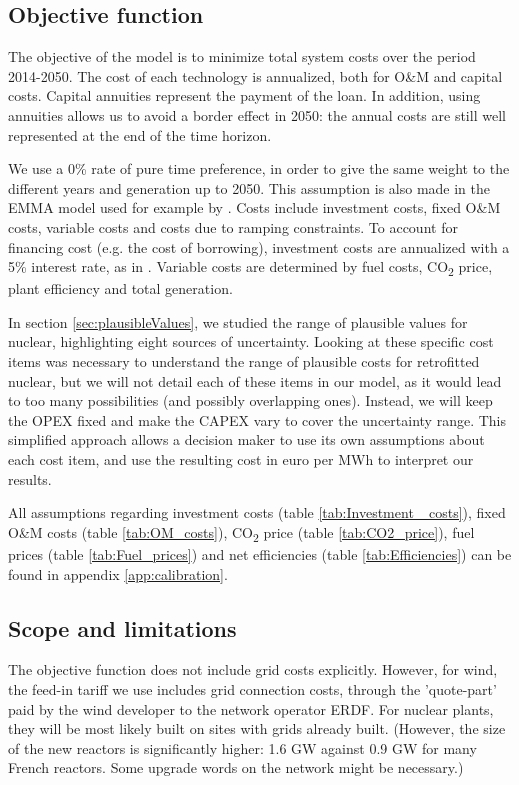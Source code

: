 \subsection{Objective function}

The objective of the model is to minimize total system costs over the period 2014-2050.
The cost of each technology is annualized, both for O\&M and capital costs. 
Capital annuities represent the payment of the loan. 
In addition, using annuities allows us to avoid a border effect in 2050: the annual costs are still well represented at the end of the time horizon.

We use a 0\% rate of pure time preference, in order to give the same weight to the different years and generation up to 2050. This assumption is also made in the EMMA model \citep{EMMA} used for example by \citet{Hirth2016}.
Costs include investment costs, fixed O\&M costs, variable costs and costs due to ramping constraints.
To account for financing cost (e.g. the cost of borrowing), investment costs are annualized with a 5\% interest rate, as in \citet{Jagemann2013}.
Variable costs are determined by fuel costs, CO\textsubscript{2} price, plant efficiency and total generation.

In section \ref{sec:plausibleValues}, we studied the range of plausible values for nuclear, highlighting eight sources of uncertainty. Looking at these specific cost items was necessary to understand the range of plausible costs for retrofitted nuclear, but we will not detail each of these items in our model, as it would lead to too many possibilities (and possibly overlapping ones). Instead, we will keep the OPEX fixed and make the CAPEX vary to cover the uncertainty range. This simplified approach allows a decision maker to use its own assumptions about each cost item, and use the resulting cost in euro per MWh to interpret our results.

All assumptions regarding investment costs (table \ref{tab:Investment _costs}), fixed O\&M costs (table \ref{tab:OM_costs}), CO\textsubscript{2} price (table \ref{tab:CO2_price}), fuel prices (table \ref{tab:Fuel_prices}) and net efficiencies (table \ref{tab:Efficiencies}) can be found in appendix \ref{app:calibration}.

\subsection{Scope and limitations}

The objective function does not include grid costs explicitly.
However, for wind, the feed-in tariff we use includes grid connection costs, through the 'quote-part' paid by the wind developer to the network operator ERDF.
For nuclear plants, they will be most likely built on sites with grids already built. (However, the size of the new reactors is significantly higher: 1.6 GW against 0.9 GW for many French reactors. Some upgrade words on the network might be necessary.)

